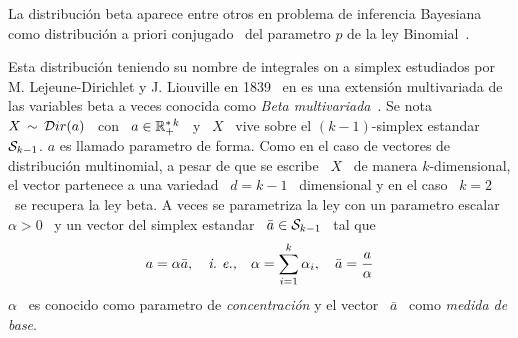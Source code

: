 La distribuci\'on beta  aparece entre otros en problema  de inferencia Bayesiana
como   distribuci\'on   a   priori  conjugado~   del
parametro $p$ de la ley Binomial~\cite{Rob07}.




\label{Sssec:MP:Dirichlet}

Esta distribuci\'on teniendo su nombre de integrales on a simplex estudiados por
M. Lejeune-Dirichlet y J. Liouville  en 1839~\cite{GupRic01, Dir39, Lio39} en es
una extensi\'on  multivariada de las variables  beta a veces  conocida como {\em
  Beta multivariada}~\cite{OlkRub64}. Se  nota \ $X \, \sim \,  \mathcal{D}ir(a)$ \ con \
$a \in \mathbb{R}_+^{*  \, k}$ \ y \  $X$ \ vive sobre el  $(k-1)$-simplex estandar \
$\mathcal{S}_{k-1}$.  $a$ es  llamado parametro de forma. Como en  el caso de vectores
de  distribuci\'on multinomial, a  pesar de  que se  escribe \  $X$ \  de manera
$k$-dimensional, el vector partenece a una  variedad \ $d = k-1$ \ dimensional y
en el caso  \ $k = 2$ \ se  recupera la ley beta. A veces  se parametriza la ley
con un  parametro escalar \ $\alpha  > 0$ \ y  un vector del  simplex estandar \
$\bar{a} \in \mathcal{S}_{k-1}$ \ tal que
%
\[
a = \alpha \bar{a}, \quad \mbox{{\it i.~e.,}} \quad \alpha = \sum_{i=1}^k \alpha_i, \quad
\bar{a} = \frac{a}{\alpha}
\]
%
$\alpha$ \  es conocido como  parametro de {\em  concentraci\'on} y el  vector \
$\bar{a}$ \ como {\em medida de base}.


